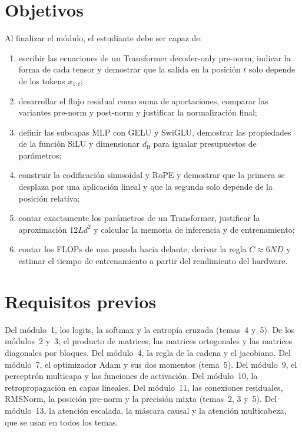 \documentclass[11pt,a4paper,twoside,openany]{book}
\newcommand{\dff}{d_{\mathrm{ff}}}
\begin{document}
\section*{Objetivos}
Al finalizar el módulo, el estudiante debe ser capaz de:
\begin{enumerate}[label=\arabic*.]
  \item escribir las ecuaciones de un Transformer decoder-only pre-norm, indicar la forma de cada tensor y demostrar que la salida en la posición $t$ solo depende de los tokens $x_{1:t}$;
  \item desarrollar el flujo residual como suma de aportaciones, comparar las variantes pre-norm y post-norm y justificar la normalización final;
  \item definir las subcapas MLP con GELU y SwiGLU, demostrar las propiedades de la función SiLU y dimensionar $\dff$ para igualar presupuestos de parámetros;
  \item construir la codificación sinusoidal y RoPE y demostrar que la primera se desplaza por una aplicación lineal y que la segunda solo depende de la posición relativa;
  \item contar exactamente los parámetros de un Transformer, justificar la aproximación $12Ld^{2}$ y calcular la memoria de inferencia y de entrenamiento;
  \item contar los FLOPs de una pasada hacia delante, derivar la regla $C\approx 6ND$ y estimar el tiempo de entrenamiento a partir del rendimiento del hardware.
\end{enumerate}

\section*{Requisitos previos}
Del módulo~1, los logits, la softmax y la entropía cruzada (temas~4 y~5). De los módulos~2 y~3, el producto de matrices, las matrices ortogonales y las matrices diagonales por bloques. Del módulo~4, la regla de la cadena y el jacobiano. Del módulo~7, el optimizador Adam y sus dos momentos (tema~5). Del módulo~9, el perceptrón multicapa y las funciones de activación. Del módulo~10, la retropropagación en capas lineales. Del módulo~11, las conexiones residuales, RMSNorm, la posición pre-norm y la precisión mixta (temas~2, 3 y~5). Del módulo~13, la atención escalada, la máscara causal y la atención multicabeza, que se usan en todos los temas.
\end{document}
